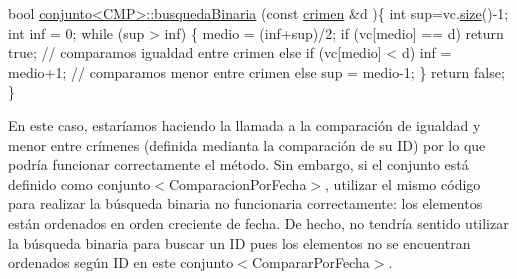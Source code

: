 \begin{DoxyCode}
\textcolor{keywordtype}{bool} \hyperlink{classconjunto}{conjunto<CMP>::busquedaBinaria} (\textcolor{keyword}{const} \hyperlink{classcrimen}{crimen} &d )\{
    \textcolor{keywordtype}{int} sup=vc.\hyperlink{classconjunto_af9962de5f6425f2030dc0e63015f85b3}{size}()-1;
    \textcolor{keywordtype}{int} inf = 0;
    \textcolor{keywordflow}{while} (sup > inf) \{
      medio = (inf+sup)/2;
      \textcolor{keywordflow}{if} (vc[medio] == d) \textcolor{keywordflow}{return} \textcolor{keyword}{true};  \textcolor{comment}{// comparamos igualdad entre crimen}
      \textcolor{keywordflow}{else} \textcolor{keywordflow}{if} (vc[medio] < d) inf = medio+1; \textcolor{comment}{// comparamos menor entre crimen}
      \textcolor{keywordflow}{else} sup = medio-1;
    \}
    \textcolor{keywordflow}{return} \textcolor{keyword}{false};
\}
\end{DoxyCode}
 En este caso, estaríamos haciendo la llamada a la comparación de igualdad y menor entre crímenes (definida medianta la comparación de su I\+D) por lo que podría funcionar correctamente el método. Sin embargo, si el conjunto está definido como conjunto$<$\+Comparacion\+Por\+Fecha$>$, utilizar el mismo código para realizar la búsqueda binaria no funcionaria correctamente\+: los elementos están ordenados en orden creciente de fecha. De hecho, no tendría sentido utilizar la búsqueda binaria para buscar un I\+D pues los elementos no se encuentran ordenados según I\+D en este conjunto$<$\+Comparar\+Por\+Fecha$>$.

